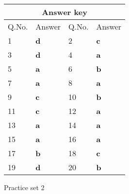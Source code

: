 \begin{table}[H]
	\centering
	
	\begin{tabular}{|p{1.5cm}|p{1.5cm}||p{1.5cm}|p{1.5cm}|}
		\hline
		\multicolumn{4}{|c|}{\textbf{Answer key}}\\\hline\hline
		\rowcolor{ocrel}Q.No.&Answer&Q.No.&Answer\\\hline
		1&\textbf{d}&2&\textbf{c}\\\hline
		3&\textbf{d}&4&\textbf{a}\\\hline
		5&\textbf{a}&6&\textbf{b}\\\hline
		7&\textbf{a}&8&\textbf{a}\\\hline
		9&\textbf{c}&10&\textbf{b}\\\hline
		11&\textbf{c}&12&\textbf{a}\\\hline
		13&\textbf{a}&14&\textbf{a}\\\hline
		15&\textbf{a}&16&\textbf{a}\\\hline
		17&\textbf{b}&18&\textbf{c}\\\hline
		19&\textbf{d}&20&\textbf{b}\\\hline
	\end{tabular}
\end{table}


\newpage
\begin{abox}
	Practice set 2
	\end{abox}

